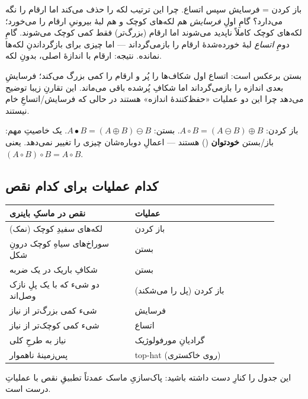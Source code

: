 \documentclass[12pt,a4paper]{article}
\begin{document}
باز کردن = فرسایش سپس اتساع. چرا این ترتیب لکه را حذف می‌کند اما ارقام را نگه می‌دارد؟ گامِ اولِ
\emph{فرسایش} هم لکه‌های کوچک و هم لبهٔ بیرونیِ ارقام را می‌خورد؛ لکه‌های کوچک کاملاً ناپدید
می‌شوند اما ارقام (بزرگ‌تر) فقط کمی کوچک می‌شوند. گامِ دومِ \emph{اتساع} لبهٔ خورده‌شدهٔ ارقام را
بازمی‌گرداند — اما چیزی برای بازگرداندنِ لکه‌ها نمانده. نتیجه: ارقام با اندازهٔ اصلی، بدونِ لکه.

بستن برعکس است: اتساع اول شکاف‌ها را پُر و ارقام را کمی بزرگ می‌کند؛ فرسایشِ بعدی اندازه را
بازمی‌گرداند اما شکافِ پُرشده باقی می‌ماند. این تقارنِ زیبا توضیح می‌دهد چرا این دو عملیات
«حفظ‌کنندهٔ اندازه» هستند در حالی که فرسایش/اتساعِ خام نیستند.

\begin{riyazi}
باز کردن: $A \circ B = (A \ominus B) \oplus B$. \quad بستن: $A \bullet B = (A \oplus B) \ominus B$.
یک خاصیتِ مهم: باز/بستن \textbf{خودتوان} () هستند — اعمالِ دوباره‌شان چیزی را تغییر
نمی‌دهد. یعنی $(A \circ B) \circ B = A \circ B$.
\end{riyazi}

\subsection{کدام عملیات برای کدام نقص}

\begin{center}
\begin{tabular}{>{\raggedright\arraybackslash}p{0.42\linewidth} >{\raggedright\arraybackslash}p{0.48\linewidth}}
\toprule
\textbf{نقص در ماسکِ باینری} & \textbf{عملیات} \\
\midrule
لکه‌های سفیدِ کوچک (نمک) & باز کردن \\
سوراخ‌های سیاهِ کوچک درونِ شکل & بستن \\
شکافِ باریک در یک ضربه & بستن \\
دو شیء که با یک پلِ نازک وصل‌اند & باز کردن (پل را می‌شکند) \\
شیء کمی بزرگ‌تر از نیاز & فرسایش \\
شیء کمی کوچک‌تر از نیاز & اتساع \\
نیاز به طرحِ کلی & گرادیانِ مورفولوژیک \\
پس‌زمینهٔ ناهموار & top-hat (روی خاکستری) \\
\bottomrule
\end{tabular}
\end{center}

این جدول را کنارِ دست داشته باشید: پاک‌سازیِ ماسک عمدتاً تطبیقِ نقص با عملیاتِ درست است.
\end{document}
